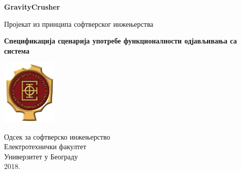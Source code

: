 \begin{titlepage}
	\begin{center}
	
		\vspace*{1cm}
		
		\Huge
		\textbf{GravityCrusher}
		
		\vspace{0.5cm}
		\LARGE
		Пројекат из принципа софтверског инжењерства
		
		\vspace{1.5cm}
		\Large		
		\textbf{Спецификација сценарија употребе функционалности одјављивања са система}
		
		\vfill
		
		\includegraphics[width=0.2\textwidth]{../../resources/etflogo}
		
		\large
		Одсек за софтверско инжењерство\\
		Електротехнички факултет\\
		Универзитет у Београду\\
		2018.
	
	\end{center}
\end{titlepage}
